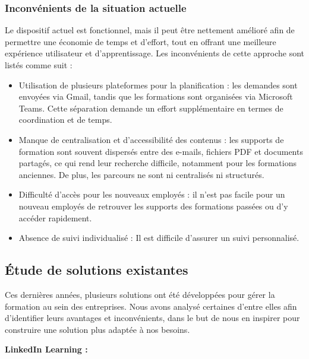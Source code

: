 \documentclass{article}
\begin{document}
\subsubsection{Inconvénients de la situation actuelle}
\vspace{0,3cm}
\hspace*{2em}Le dispositif actuel est fonctionnel, mais il peut être nettement amélioré afin de permettre une économie de temps et d’effort, tout en offrant une meilleure expérience utilisateur et d’apprentissage.
Les inconvénients de cette approche sont listés comme suit :
\begin{itemize}
    \item Utilisation de plusieurs plateformes pour la planification : les demandes sont envoyées via Gmail, tandis que les formations sont organisées via Microsoft Teams. Cette séparation demande un effort supplémentaire en termes de coordination et de temps.
    \item Manque de centralisation et d’accessibilité des contenus : les supports de formation sont souvent dispersés entre des e-mails, fichiers PDF et documents partagés, ce qui rend leur recherche difficile, notamment pour les formations anciennes. De plus, les parcours ne sont ni centralisés ni structurés.
    \item Difficulté d’accès pour les nouveaux employés : il n’est pas facile pour un nouveau employés  de retrouver les supports des formations passées ou d’y accéder rapidement.
    \item Absence de suivi individualisé : Il est difficile d’assurer un suivi personnalisé.
\end{itemize}


\subsection{Étude de solutions existantes}
\hspace*{2em}Ces dernières années, plusieurs solutions ont été développées pour gérer la formation au sein des entreprises. Nous avons analysé certaines d’entre elles afin d’identifier leurs avantages et inconvénients, dans le but de nous en inspirer pour construire une solution plus adaptée à nos besoins.

\hspace{1cm}

\noindent \textbf{LinkedIn Learning \cite{Linkedin-Learning}:}

\vspace{0.3cm}
\end{document}
